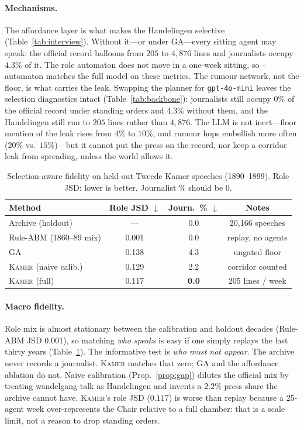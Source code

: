 \documentclass[sigconf,review,anonymous]{acmart}
\newcommand{\sys}{\textsc{Kamer}}
\begin{document}
\paragraph{Mechanisms.} The affordance layer is what makes the
Handelingen selective (Table~\ref{tab:interview}). Without it---or under
GA---every sitting agent may speak: the official record balloons from
$205$ to $4{,}876$ lines and journalists occupy $4.3\%$ of it. The role
automaton does not move in a one-week sitting, so --automaton matches
the full model on these metrics. The rumour network, not the floor, is
what carries the leak. Swapping the planner for \texttt{gpt-4o-mini}
leaves the selection diagnostics intact (Table~\ref{tab:backbone}):
journalists still occupy $0\%$ of the official record under standing
orders and $4.3\%$ without them, and the Handelingen still run to $205$
lines rather than $4{,}876$. The LLM is not inert---floor mention of the
leak rises from $4\%$ to $10\%$, and rumour hops embellish more often
($20\%$ vs.\ $15\%$)---but it cannot put the press on the record, nor
keep a corridor leak from spreading, unless the world allows it.

\begin{table}[t]
\caption{Selection-aware fidelity on held-out Tweede Kamer speeches
(1890--1899). Role JSD: lower is better. Journalist \% should be $0$.}
\label{tab:main}
\centering\small
\setlength{\tabcolsep}{4pt}
\begin{tabular}{lccc}
\toprule
Method & Role JSD $\downarrow$ & Journ.\ \% $\downarrow$ & Notes \\
\midrule
Archive (holdout) & --- & 0.0 & 20{,}166 speeches \\
Rule-ABM (1860--89 mix) & 0.001 & 0.0 & replay, no agents \\
GA~\cite{park2023generative} & 0.138 & 4.3 & ungated floor \\
\sys{} (naive calib.) & 0.129 & 2.2 & corridor counted \\
\sys{} (full) & 0.117 & \textbf{0.0} & 205 lines / week \\
\bottomrule
\end{tabular}
\end{table}

\paragraph{Macro fidelity.} Role mix is almost stationary between the
calibration and holdout decades (Rule-ABM JSD $0.001$), so matching
\emph{who speaks} is easy if one simply replays the last thirty years
(Table~\ref{tab:main}). The informative test is \emph{who must not
appear}. The archive never records a journalist. \sys{} matches that
zero; GA and the affordance ablation do not. Naive calibration
(Prop.~\ref{prop:gap}) dilutes the official mix by treating wandelgang
talk as Handelingen and invents a $2.2\%$ press share the archive
cannot have. \sys{}'s role JSD ($0.117$) is worse than replay because
a 25-agent week over-represents the Chair relative to a full chamber:
that is a scale limit, not a reason to drop standing orders.
\end{document}
